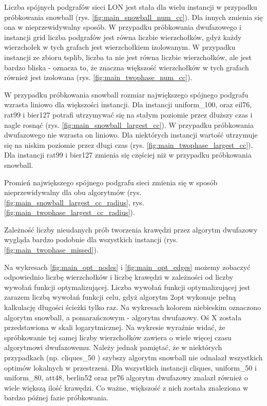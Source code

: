 Liczba spójnych podgrafów sieci LON jest stała dla wielu instancji w przypadku próbkowania snowball (rys. \ref{fig:main_snowball_num_cc}). Dla innych zmienia się ona w nieprzewidywalny sposób.
W przypadku próbkowania dwufazowego i instancji grid liczba podgrafów jest równa liczbie wierzchołków, gdyż każdy wierzchołek w tych grafach jest wierzchołkiem izolowanym.
W przypadku instancji ze zbioru tsplib, liczba ta nie jest równa liczbie wierzchołków, ale jest bardzo bliska - oznacza to, że znaczna większość
wierzchołków w tych grafach również jest izolowana (rys. \ref{fig:main_twophase_num_cc}).

W przypadku próbkowania snowball rozmiar największego spójnego podgrafu wzrasta liniowo dla większości instancji. Dla instancji uniform\_100, oraz
eil76, rat99 i bier127 potrafi utrzymywać się na stałym poziomie przez dłuższy czas i nagle rosnąć (rys. \ref{fig:main_snowball_largest_cc}).
W przypadku próbkowania dwufazowego nie wzrasta on liniowo. Dla niektórych instancji wartość utrzymuje się na niskim poziomie przez długi czas (rys. \ref{fig:main_twophase_largest_cc}).
Dla instancji rat99 i bier127 zmienia się częściej niż w przypadku próbkowania snowball.

Promień największego spójnego podgrafu sieci zmienia się w sposób nieprzewidywalny dla obu algorytmów (rys. \ref{fig:main_snowball_largest_cc_radius}, rys. \ref{fig:main_twophase_largest_cc_radius}). 

Zależność liczby nieudanych prób tworzenia krawędzi przez algorytm dwufazowy wygląda bardzo podobnie dla wszystkich instancji (rys. \ref{fig:main_twophase_missed}).

Na wykresach \ref{fig:main_opt_nodes} i \ref{fig:main_opt_edges} możemy zobaczyć odpowiednio liczbę wierzchołków i liczbę krawędzi
w zależności od liczby wywołań funkcji optymalizującej. Liczba wywołań funkcji optymalizującej jest zarazem liczbą wywołań funkcji celu, gdyż
algorytm 2opt wykonuje pełną kalkulację długości ścieżki tylko raz.
Na wykresach kolorem niebieskim oznaczono algorytm snowball, a pomarańczowym - algorytm dwufazowy.
Oś X została przedstawiona w skali logarytmicznej.
Na wykresie wyraźnie widać, że spróbkowanie tej samej liczby wierzchołków zawiera o wiele więcej czasu algorytmowi dwufazowemu.
Należy jednak pamiętać, że w niektórych przypadkach (np. cliques\_50 ) szybszy algorytm snowball nie odnalazł wszystkich optimów lokalnych w przestrzeni.
Dla wszystkich instancji cliques, uniform\_50 i uniform\_80, att48, berlin52 oraz pr76 algorytm dwufazowy znalazł również o wiele większą ilość krawędzi.
Co ważne, większość z nich została znaleziona w bardzo późnej fazie próbkowania.

